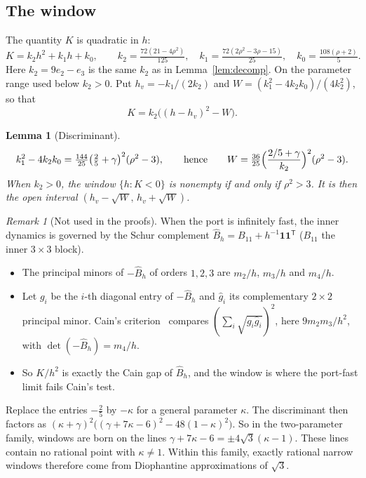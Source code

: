 \documentclass[11pt,a4paper]{article}
\theoremstyle{plain}
\newtheorem{lemma}[theorem]{Lemma}
\theoremstyle{definition}
\theoremstyle{remark}
\newtheorem{remark}[theorem]{Remark}
\newcommand{\one}{\mathbf{1}}
\begin{document}
\subsection{The window}
The quantity $K$ is quadratic in $h$:
\[
K=k_2h^2+k_1h+k_0,\qquad k_2=\tfrac{72(21-4\rho^2)}{125},\quad
k_1=\tfrac{72(2\rho^2-3\rho-15)}{25},\quad k_0=\tfrac{108(\rho+2)}{5}.
\]
Here $k_2=9e_2-e_3$ is the same $k_2$ as in Lemma~\ref{lem:decomp}. On the parameter
range used below $k_2>0$. Put $h_v=-k_1/(2k_2)$ and $W=(k_1^2-4k_2k_0)/(4k_2^2)$, so
that
\begin{equation}\label{eq:window}
K=k_2\bigl((h-h_v)^2-W\bigr).
\end{equation}

\begin{lemma}[Discriminant]\label{lem:disc}
\[
k_1^2-4k_2k_0=\tfrac{144}{25}\bigl(\tfrac25+\gamma\bigr)^2(\rho^2-3),\qquad\text{hence}\qquad
W=\tfrac{36}{25}\Bigl(\frac{2/5+\gamma}{k_2}\Bigr)^2(\rho^2-3).
\]
When $k_2>0$, the window $\{h:K<0\}$ is nonempty if and only if $\rho^2>3$. It is then the
open interval $(h_v-\sqrt W,\,h_v+\sqrt W)$.
\end{lemma}

\begin{remark}[Not used in the proofs]\label{rem:schur}
When the port is infinitely fast, the inner dynamics is governed by the Schur complement
$\widehat B_h=B_{11}+h^{-1}\one\one^{\mathsf T}$ ($B_{11}$ the inner $3\times3$ block).
\begin{itemize}
\item The principal minors of $-\widehat B_h$ of orders $1,2,3$ are $m_2/h$, $m_3/h$ and
$m_4/h$.
\item Let $g_i$ be the $i$-th diagonal entry of $-\widehat B_h$ and $\hat g_i$ its
complementary $2\times2$ principal minor. Cain's criterion~\cite{cain1976} compares
$(\sum_i\sqrt{g_i\hat g_i})^2$, here $9m_2m_3/h^2$, with $\det(-\widehat B_h)=m_4/h$.
\item So $K/h^2$ is exactly the Cain gap of $\widehat B_h$, and the window is where the
port-fast limit fails Cain's test.
\end{itemize}
Replace the entries $-\tfrac25$ by $-\kappa$ for a general parameter $\kappa$. The
discriminant then factors as
$(\kappa+\gamma)^2\bigl((\gamma+7\kappa-6)^2-48(1-\kappa)^2\bigr)$. So in the
two-parameter family, windows are born on the lines $\gamma+7\kappa-6=\pm4\sqrt3(\kappa-1)$.
These lines contain no rational point with $\kappa\ne1$. Within this family, exactly
rational narrow windows therefore come from Diophantine approximations of $\sqrt3$.
\end{remark}
\end{document}
